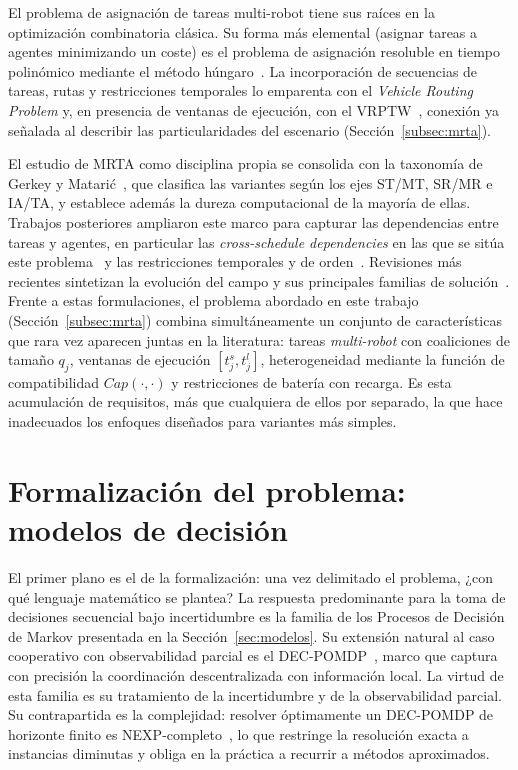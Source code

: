 El problema de asignación de tareas multi-robot tiene sus raíces en la optimización combinatoria clásica. Su forma más elemental (asignar tareas a agentes minimizando un coste) es el problema de asignación resoluble en tiempo polinómico mediante el método húngaro~\cite{kuhn1955hungarian}. La incorporación de secuencias de tareas, rutas y restricciones temporales lo emparenta con el \textit{Vehicle Routing Problem} y, en presencia de ventanas de ejecución, con el VRPTW~\cite{tothvigo2014vehicle}, conexión ya señalada al describir las particularidades del escenario (Sección~\ref{subsec:mrta}).

El estudio de MRTA como disciplina propia se consolida con la taxonomía de Gerkey y Matarić~\cite{gerkey2004taxonomy}, que clasifica las variantes según los ejes ST/MT, SR/MR e IA/TA, y establece además la dureza computacional de la mayoría de ellas. Trabajos posteriores ampliaron este marco para capturar las dependencias entre tareas y agentes, en particular las \textit{cross-schedule dependencies} en las que se sitúa este problema~\cite{korsah2013taxonomy} y las restricciones temporales y de orden~\cite{nunes2017taxonomy}. Revisiones más recientes sintetizan la evolución del campo y sus principales familias de solución~\cite{khamis2015survey}. Frente a estas formulaciones, el problema abordado en este trabajo (Sección~\ref{subsec:mrta}) combina simultáneamente un conjunto de características que rara vez aparecen juntas en la literatura: tareas \emph{multi-robot} con coaliciones de tamaño $q_j$, ventanas de ejecución $[t_j^s,t_j^l]$, heterogeneidad mediante la función de compatibilidad $\textit{Cap}(\cdot,\cdot)$ y restricciones de batería con recarga. Es esta acumulación de requisitos, más que cualquiera de ellos por separado, la que hace inadecuados los enfoques diseñados para variantes más simples.

\section{Formalización del problema: modelos de decisión} \label{sec:ea-formalizacion}
 
El primer plano es el de la formalización: una vez delimitado el problema, ¿con qué lenguaje matemático se plantea? La respuesta predominante para la toma de decisiones secuencial bajo incertidumbre es la familia de los Procesos de Decisión de Markov presentada en la Sección~\ref{sec:modelos}. Su extensión natural al caso cooperativo con observabilidad parcial es el DEC-POMDP~\cite{bernstein2002complexity,oliehoek2016concise}, marco que captura con precisión la coordinación descentralizada con información local. La virtud de esta familia es su tratamiento de la incertidumbre y de la observabilidad parcial. Su contrapartida es la complejidad: resolver óptimamente un DEC-POMDP de horizonte finito es NEXP-completo~\cite{bernstein2002complexity}, lo que restringe la resolución exacta a instancias diminutas y obliga en la práctica a recurrir a métodos aproximados.

